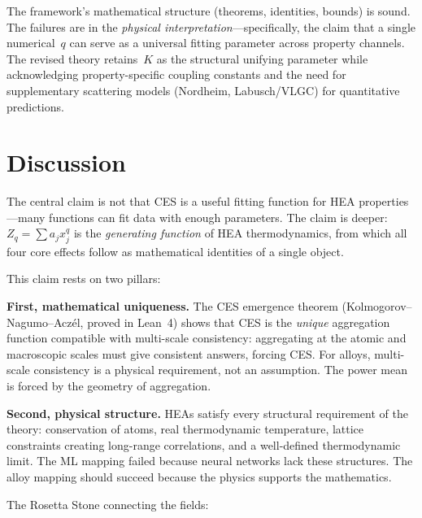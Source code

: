 \documentclass[12pt,letterpaper]{article}
\theoremstyle{definition}
\begin{document}
The framework's mathematical structure (theorems, identities, bounds) is sound.  The failures are in the \emph{physical interpretation}---specifically, the claim that a single numerical~$q$ can serve as a universal fitting parameter across property channels.  The revised theory retains~$K$ as the structural unifying parameter while acknowledging property-specific coupling constants and the need for supplementary scattering models (Nordheim, Labusch/VLGC) for quantitative predictions.


\section{Discussion}

The central claim is not that CES is a useful fitting function for HEA properties---many functions can fit data with enough parameters.  The claim is deeper: $Z_q = \sum a_j x_j^q$ is the \emph{generating function} of HEA thermodynamics, from which all four core effects follow as mathematical identities of a single object.

This claim rests on two pillars:

\textbf{First, mathematical uniqueness.}  The CES emergence theorem (Kolmogorov--Nagumo--Acz\'el, proved in Lean~4) shows that CES is the \emph{unique} aggregation function compatible with multi-scale consistency: aggregating at the atomic and macroscopic scales must give consistent answers, forcing CES\@.  For alloys, multi-scale consistency is a physical requirement, not an assumption.  The power mean is forced by the geometry of aggregation.

\textbf{Second, physical structure.}  HEAs satisfy every structural requirement of the theory: conservation of atoms, real thermodynamic temperature, lattice constraints creating long-range correlations, and a well-defined thermodynamic limit.  The ML mapping failed because neural networks lack these structures.  The alloy mapping should succeed because the physics supports the mathematics.

The Rosetta Stone connecting the fields:
\end{document}
